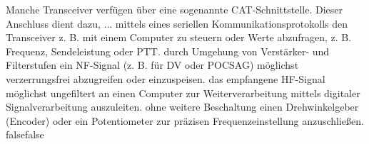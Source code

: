     {Manche Transceiver verfügen über eine sogenannte CAT-Schnittstelle. Dieser Anschluss dient dazu, ...}
    {mittels eines seriellen Kommunikationsprotokolls den Transceiver z. B. mit einem Computer zu steuern oder Werte abzufragen, z. B. Frequenz, Sendeleistung oder PTT.}
    {durch Umgehung von Verstärker- und Filterstufen ein NF-Signal (z. B. für DV oder POCSAG) möglichst verzerrungsfrei abzugreifen oder einzuspeisen.}
    {das empfangene HF-Signal möglichst ungefiltert an einen Computer zur Weiterverarbeitung mittels digitaler Signalverarbeitung auszuleiten.}
    {ohne weitere Beschaltung einen Drehwinkelgeber (Encoder) oder ein Potentiometer zur präzisen Frequenzeinstellung anzuschließen.}
    {false}{false}